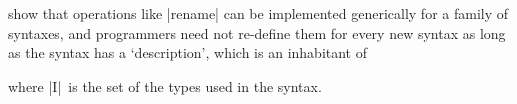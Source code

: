 \documentclass[sigplan,review,fleqn]{acmart}
\renewcommand{\verb}{\collectverb{\color{AgdaFunction}}}
\newcommand{\name}{\collectverb{\it}}
\begin{document}
\citeauthor{Allais-generic-syntax} show that operations like \verb|rename| can be implemented generically for a family of syntaxes, and programmers need not re-define them for every new syntax as long as the syntax has a `description', which is an inhabitant of
\begin{code}
	\>[0]\AgdaSpace{}%
	\AgdaSpace{}%
	\AgdaSymbol{(}\AgdaSpace{}%
	\AgdaSymbol{:}\AgdaSpace{}%
	\AgdaSymbol{)}\AgdaSpace{}%
	\AgdaSymbol{:}\AgdaSpace{}%
	\<%
\end{code}
where \name|I|\/~is the set of the types used in the syntax.
\end{document}
